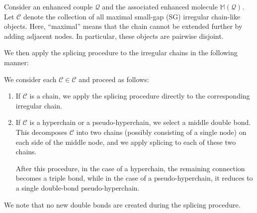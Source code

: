 \documentclass[UTF-8,reqno]{amsart}
\numberwithin{equation}{section}
\theoremstyle{definition}
\begin{document}
 Consider an enhanced couple $\mathcal Q$ and the associated enhanced molecule $\mathbb{M}(\mathcal{Q})$. Let $\mathscr C$ denote the collection of all maximal small-gap (SG) irregular chain-like objects. Here, “maximal” means that the chain cannot be extended further by adding adjacent nodes. In particular, these objects are pairwise disjoint.
 
We then apply the splicing procedure to the irregular chains in the following manner:

\medskip

We consider each $\mathcal{C}\in \mathscr C$ and proceed as follows:
\begin{enumerate}
\item If $\mathcal{C}$ is a chain, we apply the splicing procedure directly to the corresponding irregular chain.
\item If $\mathcal{C}$ is a hyperchain or a pseudo-hyperchain, we select a middle double bond. This decomposes $\mathcal{C}$ into two chains (possibly consisting of a single node) on each side of the middle node, and we apply splicing to each of these two chains.

After this procedure, in the case of a hyperchain, the remaining connection becomes a triple bond, while in the case of a pseudo-hyperchain, it reduces to a single double-bond pseudo-hyperchain. 
\end{enumerate}

\medskip
We note that no new double bonds are created during the splicing procedure.
\end{document}
